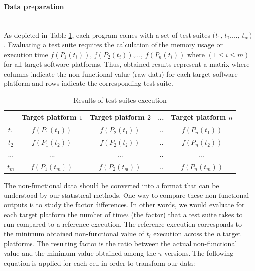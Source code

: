 \paragraph{Data preparation}~\\ 
As depicted in Table \ref{tab:Non-functional output results}, each program comes with a set of test suites $(t_{1}$, $t_{2}$,..., $t_{m})$. Evaluating a test suite requires the calculation of the memory usage or execution time $f(P_{1}(t_{i}))$,  $f(P_{2}(t_{i}))$,..., $f(P_{n}(t_{i}))$ where $(1 \leq i \leq m)$  for all target software platforms. Thus, obtained results represent a matrix where columns indicate the non-functional value (raw data) for each target software platform and rows indicate the corresponding test suite.
\begin{table}[h]
	\centering
	
	\begin{tabular}{|c| c |c |c| c|}				
		\hline

		 &  Target platform $1$ &  Target platform $2$ & ... & Target platform $n$  \\ \hline
		$t_{1}$  &  $f(P_{1}(t_{1}))$ &  $f(P_{2}(t_{1}))$ & ... & $f(P_{n}(t_{1}))$  \\ \hline
		$t_{2}$ &  $f(P_{1}(t_{2}))$ &  $f(P_{2}(t_{2}))$ & ... & $f(P_{n}(t_{2}))$  \\ \hline
		... &  ... &  ... & ... & ...  \\ \hline
		$t_{m}$ &  $f(P_{1}(t_{m}))$ &  $f(P_{2}(t_{m}))$ & ... & $f(P_{n}(t_{m}))$  \\ \hline
	\end{tabular}
	
	\caption{Results of test suites execution}
	\label{tab:Non-functional output results}
\end{table}

The non-functional data should be converted into a format that can be understood by our statistical methods. One way to compare these non-functional outputs is to study the factor differences. In other words, we would evaluate for each target platform the number of times (the factor) that a test suite takes to run compared to a reference execution. The reference execution corresponds to the minimum obtained non-functional value of $t_{i}$ execution across the $n$ target platforms. The resulting factor is the ratio between the actual non-functional value and the minimum value obtained among the $n$ versions. The following equation is applied for each cell in order to transform our data:

